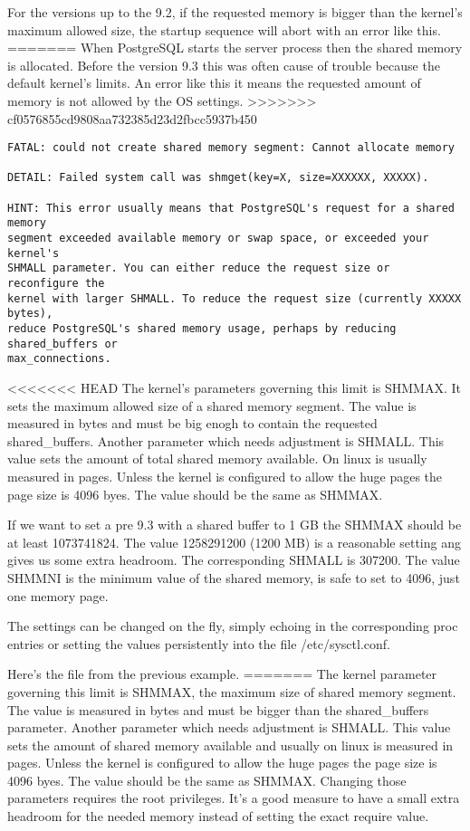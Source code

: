 For the versions up to the 9.2, if the requested memory is bigger than the kernel's maximum
allowed size, the startup sequence will abort with an error like this.
=======
When PostgreSQL starts the server process then the shared memory is allocated. Before the version
9.3 this was often cause of trouble because the default kernel's limits. An error like this it
means the requested amount of memory is not allowed by the OS settings.
>>>>>>> cf0576855cd9808aa732385d23d2fbcc5937b450

\begin{verbatim}
FATAL: could not create shared memory segment: Cannot allocate memory

DETAIL: Failed system call was shmget(key=X, size=XXXXXX, XXXXX).

HINT: This error usually means that PostgreSQL's request for a shared memory
segment exceeded available memory or swap space, or exceeded your kernel's
SHMALL parameter. You can either reduce the request size or reconfigure the
kernel with larger SHMALL. To reduce the request size (currently XXXXX bytes),
reduce PostgreSQL's shared memory usage, perhaps by reducing shared_buffers or
max_connections.
\end{verbatim}

<<<<<<< HEAD
The kernel's parameters governing this limit is SHMMAX. It sets the maximum allowed size of a shared
memory segment. The value is measured in bytes and must be big enogh to contain the
requested shared\_buffers. Another parameter which needs adjustment is SHMALL. This value sets the
amount of total shared memory available. On linux is usually measured in pages. Unless the
kernel is configured to allow the huge pages the page size is 4096 byes. The value should be the
same as SHMMAX. \newline

If we want to set a pre 9.3 with a shared buffer to 1 GB the SHMMAX should be at least 1073741824.
The value 1258291200 (1200 MB) is a reasonable setting ang gives us some extra headroom. The
corresponding SHMALL is 307200. The value SHMMNI is the minimum value of the shared memory, is safe
to set to 4096, just one memory page. 

The settings can be changed on the fly, simply echoing in the corresponding proc entries or setting
the values persistently into the file /etc/sysctl.conf.

Here's the file from the previous example.
=======
The kernel parameter governing this limit is SHMMAX, the maximum size of
shared memory segment. The value is measured in bytes and must be bigger than the shared\_buffers
parameter. Another parameter which needs adjustment is SHMALL. This value sets the amount of shared
memory available and usually on linux is measured in pages. Unless the kernel is configured to
allow the huge pages the page size is 4096 byes. The value should be the same as SHMMAX. Changing
those parameters requires the root privileges. It's a good measure to have a small extra headroom
for the needed memory instead of setting the exact require value. \newline

